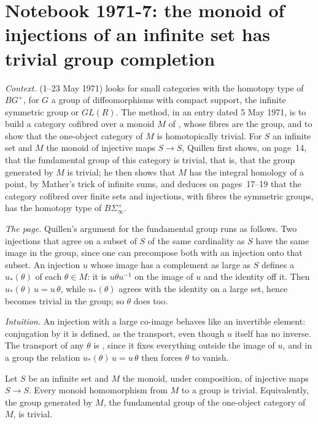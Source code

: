 \section[Notebook 1971-7: the monoid of injections of an infinite set]{Notebook 1971-7: the monoid of injections of an infinite set has trivial group completion\protect{}}\label{sec:quillen-1971-7}

\emph{Context.}  (1--23 May 1971) looks for small categories with the homotopy type of $BG^+$, for $G$ a group of diffeomorphisms with compact support, the infinite symmetric group or $GL(R)$. The method, in an entry dated 5 May 1971, is to build a category cofibred over a monoid $M$ of , whose fibres are the group, and to show that the one-object category of $M$ is homotopically trivial. For $S$ an infinite set and $M$ the monoid of injective maps $S \to S$, Quillen first shows, on page~14, that the fundamental group of this category is trivial, that is, that the group generated by $M$ is trivial; he then shows that $M$ has the integral homology of a point, by Mather's trick of infinite sums, and deduces on pages~17--19 that the category cofibred over finite sets and injections, with fibres the symmetric groups, has the homotopy type of $B\Sigma_\infty^+$.

\emph{The page.} Quillen's argument for the fundamental group runs as follows. Two injections that agree on a subset of $S$ of the same cardinality as $S$ have the same image in the group, since one can precompose both with an injection onto that subset. An injection $u$ whose image has a complement as large as $S$ defines a  $u_*(\theta)$ of each $\theta \in M$: it is $u\theta u^{-1}$ on the image of $u$ and the identity off it. Then $u_*(\theta)\, u = u\, \theta$, while $u_*(\theta)$ agrees with the identity on a large set, hence becomes trivial in the group; so $\theta$ does too.

\emph{Intuition.} An injection with a large co-image behaves like an invertible element: conjugation by it is defined, as the transport, even though $u$ itself has no inverse. The transport of any $\theta$ is , since it fixes everything outside the image of $u$, and in a group the relation $u_*(\theta)\,u = u\,\theta$ then forces $\theta$ to vanish.

\begin{encadre}
\begin{theoreme}\label{thm:quillen-1971-7}
Let $S$ be an infinite set and $M$ the monoid, under composition, of injective maps $S \to S$. Every monoid homomorphism from $M$ to a group is trivial. Equivalently, the group generated by $M$, the fundamental group of the one-object category of $M$, is trivial.
\end{theoreme}
\end{encadre}


